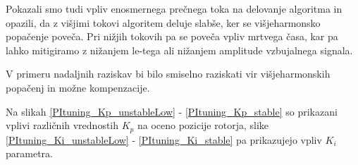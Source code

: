 \documentclass[a4paper,twoside,openright,12pt,slovene]{book}
\begin{document}
Pokazali smo tudi vpliv enosmernega prečnega toka na delovanje algoritma in opazili, da z višjimi tokovi algoritem deluje slabše, ker se višjeharmonsko popačenje poveča. Pri nižjih tokovih pa se
poveča vpliv mrtvega časa, kar pa lahko mitigiramo z nižanjem le-tega ali nižanjem amplitude vzbujalnega signala.

V primeru nadaljnih raziskav bi bilo smiselno raziskati vir višjeharmonskih popačenj in možne kompenzacije.

\cleardoublepage{} %





\appendix

Na slikah \ref{PItuning_Kp_unstableLow} - \ref{PItuning_Kp_stable} so prikazani vplivi različnih vrednostih $K_p$ na oceno pozicije rotorja, slike \ref{PItuning_Ki_unstableLow} -
\ref{PItuning_Ki_stable} pa prikazujejo vpliv $K_i$ parametra.
\end{document}
